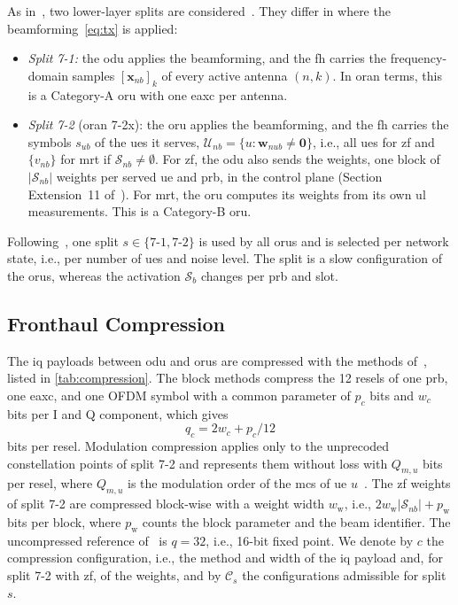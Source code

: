 \documentclass[10pt, final, journal, letterpaper, twocolumn]{IEEEtran}
\newcommand{\Uset}{\mathcal{U}}
\newcommand{\bw}{\mathbf{w}}
\newcommand{\bx}{\mathbf{x}}
\newcommand{\sone}{7\text{-}1}
\newcommand{\stwo}{7\text{-}2}
\begin{document}
As in~\cite{girycki2024eucnc}, two lower-layer splits are considered~\cite{tr38801,tr38816,oran_cus_v22}. They differ in where the beamforming~\eqref{eq:tx} is applied:
\begin{itemize}
  \item \emph{Split 7-1:} the \gls{odu} applies the beamforming, and the \gls{fh} carries the frequency-domain samples $[\bx_{nb}]_k$ of every active antenna $(n,k)$. In \gls{oran} terms, this is a Category-A \gls{oru} with one \gls{eaxc} per antenna.
  \item \emph{Split 7-2} (\gls{oran} 7-2x): the \gls{oru} applies the beamforming, and the \gls{fh} carries the symbols $s_{ub}$ of the \glspl{ue} it serves, $\Uset_{nb} = \{u : \bw_{nub} \neq \mathbf{0}\}$, i.e., all \glspl{ue} for \gls{zf} and $\{v_{nb}\}$ for \gls{mrt} if $\mathcal{S}_{nb} \neq \emptyset$. For \gls{zf}, the \gls{odu} also sends the weights, one block of $|\mathcal{S}_{nb}|$ weights per served \gls{ue} and \gls{prb}, in the control plane (Section Extension~11 of~\cite{oran_cus_v22}). For \gls{mrt}, the \gls{oru} computes its weights from its own \gls{ul} measurements. This is a Category-B \gls{oru}.
\end{itemize}
Following~\cite{girycki2024eucnc}, one split $s \in \{\sone, \stwo\}$ is used by all \glspl{oru} and is selected per network state, i.e., per number of \glspl{ue} and noise level. The split is a slow configuration of the \glspl{oru}, whereas the activation $\mathcal{S}_b$ changes per \gls{prb} and slot.

\subsection{Fronthaul Compression}\label{sec:compression}

The \gls{iq} payloads between \gls{odu} and \glspl{oru} are compressed with the methods of~\cite[Annex~A]{oran_cus_v22}, listed in \cref{tab:compression}. The block methods compress the 12 \glspl{resel} of one \gls{prb}, one \gls{eaxc}, and one OFDM symbol with a common parameter of $p_c$ bits and $w_c$ bits per I and Q component, which gives
\begin{equation}
  q_c = 2 w_c + p_c / 12
  \label{eq:qc}
\end{equation}
bits per \gls{resel}. Modulation compression applies only to the unprecoded constellation points of split 7-2 and represents them without loss with $Q_{m,u}$ bits per \gls{resel}, where $Q_{m,u}$ is the modulation order of the \gls{mcs} of \gls{ue} $u$~\cite{ts38214,lagen2021modcomp}. The \gls{zf} weights of split 7-2 are compressed block-wise with a weight width $w_{\mathrm{w}}$, i.e., $2 w_{\mathrm{w}} |\mathcal{S}_{nb}| + p_{\mathrm{w}}$ bits per block, where $p_{\mathrm{w}}$ counts the block parameter and the beam identifier. The uncompressed reference of~\cite{girycki2024eucnc} is $q = 32$, i.e., 16-bit fixed point. We denote by $c$ the compression configuration, i.e., the method and width of the \gls{iq} payload and, for split 7-2 with \gls{zf}, of the weights, and by $\mathcal{C}_s$ the configurations admissible for split $s$.
\end{document}
